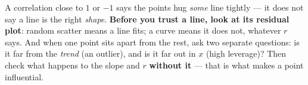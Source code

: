 \documentclass[12pt]{article}
\begin{document}
\vspace{0.14in}

\boxguard[8]
\begin{remindbox}
\small
A correlation close to $1$ or $-1$ says the points hug \emph{some} line tightly --- it does not
say a line is the right \emph{shape}. \textbf{Before you trust a line, look at its residual
plot}: random scatter means a line fits; a curve means it does not, whatever $r$ says. And
when one point sits apart from the rest, ask two separate questions: is it far from the
\emph{trend} (an outlier), and is it far out in $x$ (high leverage)? Then check what happens to
the slope and $r$ \textbf{without it} --- that is what makes a point influential.
\end{remindbox}
\end{document}
